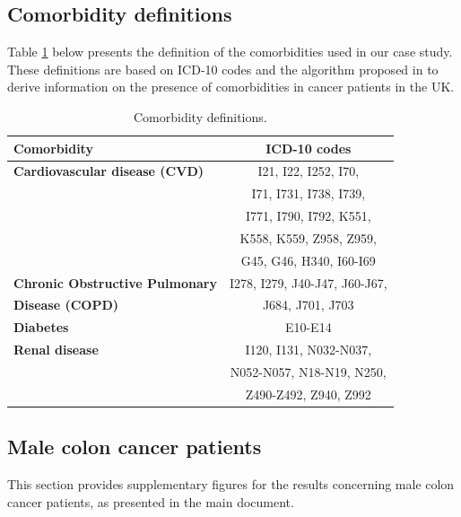 \documentclass[12pt]{article}
\begin{document}
\subsection{Comorbidity definitions}
Table \ref{tab:comorbidities} below presents the definition of the comorbidities used in our case study. These definitions are based on ICD-10 codes and the algorithm proposed in \cite{maringe:2017} to derive information on the presence of comorbidities in cancer patients in the UK.
\begin{table}[ht!]
\centering
\begin{tabular}{lc}
\textbf{Comorbidity} & \textbf{ICD-10 codes}  \\ \hline \hline
\textbf{Cardiovascular disease (CVD)} & I21, I22, I252, I70, \\ 
 & I71, I731, I738, I739, \\
 & I771, I790, I792, K551, \\
 & K558, K559, Z958, Z959, \\
 & G45, G46, H340, I60-I69  \\ \hline
\textbf{Chronic Obstructive Pulmonary} & I278, I279, J40-J47, J60-J67, \\
\textbf{Disease (COPD)} & J684, J701, J703 \\ \hline
\textbf{Diabetes} & E10-E14   \\ \hline
\textbf{Renal disease} & I120, I131, N032-N037, \\ 
& N052-N057, N18-N19, N250, \\
& Z490-Z492, Z940, Z992   \\ 
\hline \hline
\end{tabular}
\caption{Comorbidity definitions.}
\label{tab:comorbidities}
\end{table}



\subsection{Male colon cancer patients}
This section provides supplementary figures for the results concerning male colon cancer patients, as presented in the main document. 
\end{document}
